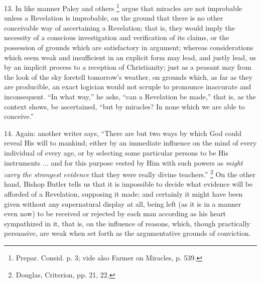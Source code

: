 13. In like manner Paley and others \footnote{Prepar. Consid.
p. 3; vide also Farmer on Miracles, p. 539.} argue that miracles are not improbable unless a Revelation is
improbable, on the ground that there is no other conceivable way of
ascertaining a Revelation; that is, they would imply the necessity of
a conscious investigation and verification of its claims, or the
possession of grounds which are satisfactory in argument; whereas
considerations which seem weak and insufficient in an explicit form
may lead, and justly lead, us by an implicit process to a reception of
Christianity; just as a peasant may from the look of the sky foretell
tomorrow's weather, on grounds which, as far as they are producible,
an exact logician would not scruple to pronounce inaccurate and
inconsequent. ``In what way,'' he asks, ``can a Revelation
be made,'' that is, as the context shows, be ascertained,
``but by miracles? In none which we are able to conceive.''

14. Again: another writer says, ``There are but two ways by
which God could reveal His will to mankind; either by an immediate
influence on the mind of every individual of every age, or by
selecting some particular persons to be His instruments ... and for
this purpose vested by Him with such powers as \emph{might carry the
strongest evidence} that they were really divine teachers.'' \footnote{Douglas,
Criterion, pp. 21, 22.} On the other hand, Bishop Butler tells us that it is impossible
to decide what evidence will be afforded of a Revelation, supposing it
made; and certainly it might have been given without any supernatural
display at all, being left (as it is in a manner even now) to be
received or rejected by each man according as his heart sympathized in
it, that is, on the influence of reasons, which, though practically
persuasive, are weak when set forth as the argumentative grounds of
conviction.

